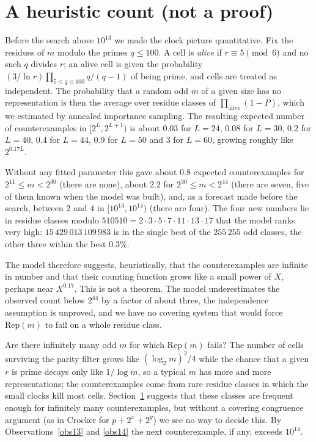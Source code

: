 \documentclass[11pt,a4paper]{article}
\theoremstyle{definition}\newtheorem{definition}[theorem]{Definition}
\theoremstyle{remark}\newtheorem{remark}[theorem]{Remark}
\newcommand{\Rep}{\mathrm{Rep}}
\begin{document}
\section{A heuristic count (not a proof)}\label{sec:heur}
Before the search above $10^{13}$ we made the clock picture quantitative. Fix the residues of $m$ modulo the
primes $q\le 100$. A cell is \emph{alive} if $r\equiv 5\pmod 6$ and no such $q$ divides $r$; an alive cell is
given the probability $(3/\ln r)\prod_{5\le q\le 100}q/(q-1)$ of being prime, and cells are treated as independent.
The probability that a random odd $m$ of a given size has no representation is then the average over residue
classes of $\prod_{\mathrm{alive}}(1-P)$, which we estimated by annealed importance sampling. The resulting expected
number of counterexamples in $[2^L,2^{L+1})$ is about $0.03$ for $L=24$, $0.08$ for $L=30$, $0.2$ for $L=40$,
$0.4$ for $L=44$, $0.9$ for $L=50$ and $3$ for $L=60$, growing roughly like $2^{0.17L}$.

Without any fitted parameter this gave about $0.8$ expected counterexamples for $2^{11}\le m<2^{30}$ (there are
none), about $2.2$ for $2^{30}\le m<2^{44}$ (there are seven, five of them known when the model was built), and, as a forecast made before the search, between
$2$ and $4$ in $[10^{13},10^{14})$ (there are four). The four new numbers lie in residue classes modulo
$510510=2\cdot3\cdot5\cdot7\cdot11\cdot13\cdot17$ that the model ranks very high: $15\,429\,013\,109\,983$ is in the
single best of the $255\,255$ odd classes, the other three within the best $0.3\%$.

The model therefore suggests, heuristically, that the counterexamples are infinite in number and that their
counting function grows like a small power of $X$, perhaps near $X^{0.17}$. This is not a theorem. The model
underestimates the observed count below $2^{44}$ by a factor of about three, the independence assumption is unproved, and we have
no covering system that would force $\Rep(m)$ to fail on a whole residue class.

\begin{question}\label{q}
Are there infinitely many odd $m$ for which $\Rep(m)$ fails? The number of cells surviving the parity filter grows
like $(\log_2 m)^2/4$ while the chance that a given $r$ is prime decays only like $1/\log m$, so a typical $m$ has
more and more representations; the counterexamples come from rare residue classes in which the small clocks kill
most cells. Section~\ref{sec:heur} suggests that these classes are frequent enough for infinitely many
counterexamples, but without a covering congruence argument (as in Crocker \cite{crocker} for $p+2^x+2^y$) we see
no way to decide this. By Observations~\ref{obs13} and \ref{obs14} the next counterexample, if any, exceeds $10^{14}$.
\end{question}
\end{document}
